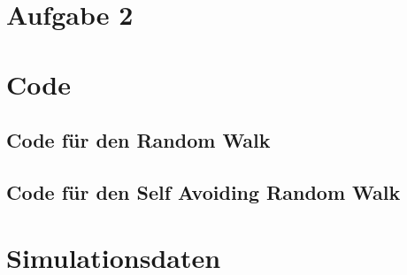 \documentclass[prb,12pt]{revtex4-2}
\theoremstyle{definition}
\theoremstyle{definition}
\begin{document}
\section{Aufgabe 2}
\appendix
\section{Code}
\subsection{Code für den Random Walk}

\subsection{Code für den Self Avoiding Random Walk}

\section{Simulationsdaten}
\end{document}
